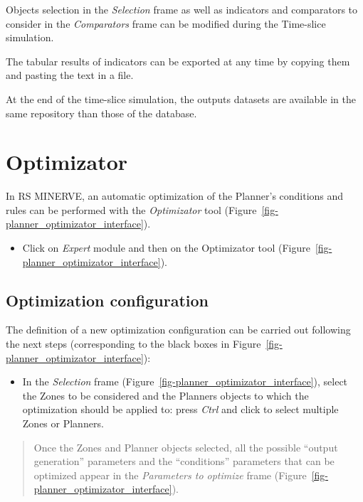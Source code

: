 \documentclass[
  letterpaper,
  DIV=11,
  numbers=noendperiod]{scrreprt}
\providecommand{\tightlist}{%
  \setlength{\itemsep}{0pt}\setlength{\parskip}{0pt}}\usepackage{longtable,booktabs,array}
\begin{document}
Objects selection in the \emph{Selection} frame as well as indicators
and comparators to consider in the \emph{Comparators} frame can be
modified during the Time-slice simulation.

The tabular results of indicators can be exported at any time by copying
them and pasting the text in a file.

At the end of the time-slice simulation, the outputs datasets are
available in the same repository than those of the database.

\hypertarget{optimizator}{%
\chapter{Optimizator}\label{optimizator}}

In RS MINERVE, an automatic optimization of the Planner's conditions and
rules can be performed with the \emph{Optimizator} tool
(Figure~\ref{fig-planner_optimizator_interface}).

\begin{itemize}
\tightlist
\item
  {Click on \emph{Expert} module and then on the Optimizator tool
  (Figure~\ref{fig-planner_optimizator_interface}).}
\end{itemize}

\hypertarget{optimization-configuration}{%
\section{Optimization configuration}\label{optimization-configuration}}

The definition of a new optimization configuration can be carried out
following the next steps (corresponding to the black boxes in
Figure~\ref{fig-planner_optimizator_interface}):

\begin{itemize}
\tightlist
\item
  {In the \emph{Selection} frame
  (Figure~\ref{fig-planner_optimizator_interface}), select the Zones to
  be considered and the Planners objects to which the optimization
  should be applied to: press \emph{Ctrl} and click to select multiple
  Zones or Planners.}
\end{itemize}

\begin{quote}
Once the Zones and Planner objects selected, all the possible ``output
generation'' parameters and the ``conditions'' parameters that can be
optimized appear in the \emph{Parameters to optimize} frame
(Figure~\ref{fig-planner_optimizator_interface}).
\end{quote}
\end{document}
